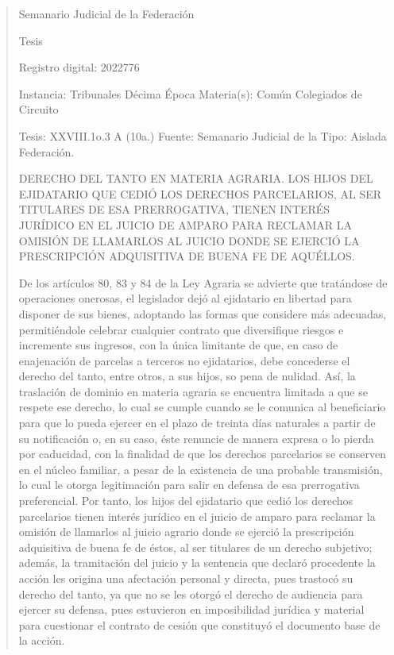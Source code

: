 \documentclass[11pt,a4paper]{article}
\begin{document}
\begin{quote}
                                                   Semanario Judicial de la Federación

                                                Tesis

 Registro digital: 2022776

 Instancia: Tribunales             Décima Época                           Materia(s): Común
 Colegiados de Circuito

 Tesis: XXVIII.1o.3 A (10a.)       Fuente: Semanario Judicial de la       Tipo: Aislada
                                   Federación.


DERECHO DEL TANTO EN MATERIA AGRARIA. LOS HIJOS DEL EJIDATARIO QUE CEDIÓ LOS
DERECHOS PARCELARIOS, AL SER TITULARES DE ESA PRERROGATIVA, TIENEN INTERÉS
JURÍDICO EN EL JUICIO DE AMPARO PARA RECLAMAR LA OMISIÓN DE LLAMARLOS AL
JUICIO DONDE SE EJERCIÓ LA PRESCRIPCIÓN ADQUISITIVA DE BUENA FE DE AQUÉLLOS.


De los artículos 80, 83 y 84 de la Ley Agraria se advierte que tratándose de operaciones onerosas,
el legislador dejó al ejidatario en libertad para disponer de sus bienes, adoptando las formas que
considere más adecuadas, permitiéndole celebrar cualquier contrato que diversifique riesgos e
incremente sus ingresos, con la única limitante de que, en caso de enajenación de parcelas a
terceros no ejidatarios, debe concederse el derecho del tanto, entre otros, a sus hijos, so pena de
nulidad. Así, la traslación de dominio en materia agraria se encuentra limitada a que se respete ese
derecho, lo cual se cumple cuando se le comunica al beneficiario para que lo pueda ejercer en el
plazo de treinta días naturales a partir de su notificación o, en su caso, éste renuncie de manera
expresa o lo pierda por caducidad, con la finalidad de que los derechos parcelarios se conserven en
el núcleo familiar, a pesar de la existencia de una probable transmisión, lo cual le otorga
legitimación para salir en defensa de esa prerrogativa preferencial. Por tanto, los hijos del ejidatario
que cedió los derechos parcelarios tienen interés jurídico en el juicio de amparo para reclamar la
omisión de llamarlos al juicio agrario donde se ejerció la prescripción adquisitiva de buena fe de
éstos, al ser titulares de un derecho subjetivo; además, la tramitación del juicio y la sentencia que
declaró procedente la acción les origina una afectación personal y directa, pues trastocó su derecho
del tanto, ya que no se les otorgó el derecho de audiencia para ejercer su defensa, pues estuvieron
en imposibilidad jurídica y material para cuestionar el contrato de cesión que constituyó el
documento base de la acción.


\end{quote}
\end{document}
